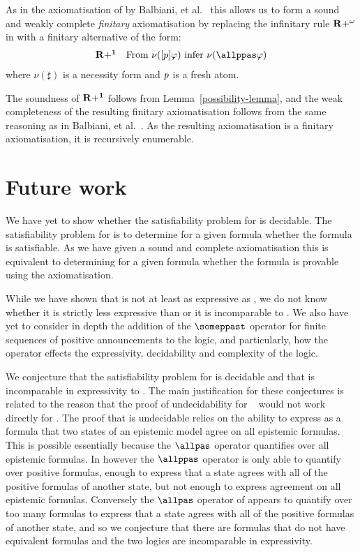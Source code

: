 As in the axiomatisation of \logicApalS{} by Balbiani, et al.~\cite{balbiani:2008} this allows us to form a sound and weakly complete {\em finitary} axiomatisation by replacing the infinitary rule ${\bf R+^\omega}$ in \axiomPapalS{} with a finitary alternative of the form:
$$
\begin{array}{ll}
    {\bf R+^1} & \text{From } \nu(\announceA{\atomP} \phi) \text{ infer } \nu(\allppas \phi)
\end{array}
$$
where $\nu(\sharp)$ is a necessity form and $p$ is a fresh atom.  

The soundness of ${\bf R+^1}$ follows from Lemma~\ref{possibility-lemma}, and the weak completeness of the resulting finitary axiomatisation follows from the same reasoning as in Balbiani, et al.~\cite{balbiani:2008}.
As the resulting axiomatisation is a finitary axiomatisation, it is recursively enumerable.

\section{Future work}\label{future-work}

We have yet to show whether the satisfiability problem for \logicPapalS{} is decidable.
The satisfiability problem for \logicPapalS{} is to determine for a given formula whether the formula is satisfiable.
As we have given a sound and complete axiomatisation this is equivalent to determining for a given formula whether the formula is provable using the axiomatisation.

While we have shown that \logicPapalS{} is not at least as expressive as \logicApalS{}, we do not know whether it is strictly less expressive than \logicApalS{} or it is incomparable to \logicApalS{}.
We also have yet to consider in depth the addition of the $\someppast$ operator for finite sequences of positive announcements to the logic, and particularly, how the operator effects the expressivity, decidability and complexity of the logic.

We conjecture that the satisfiability problem for \logicPapalS{} is decidable and that \logicPapalS{} is incomparable in expressivity to \logicApalS{}.
The main justification for these conjectures is related to the reason that the proof of undecidability for \logicApalS{}~\cite{french:2008} would not work directly for \logicPapalS{}.
The proof that \logicApalS{} is undecidable relies on the ability to express as a \langApal{} formula that two states of an epistemic model agree on all epistemic formulas.
This is possible essentially because the $\allpas$ operator quantifies over all epistemic formulas.
In \logicPapalS{} however the $\allppas$ operator is only able to quantify over positive formulas, enough to express that a state agrees with all of the positive formulas of another state, but not enough to express agreement on all epistemic formulas.
Conversely the $\allpas$ operator of \logicApalS{} appears to quantify over too many formulas to express that a state agrees with all of the positive formulas of another state, and so we conjecture that there are \langPapal{} formulas that do not have equivalent \langApal{} formulas and the two logics are incomparable in expressivity.
